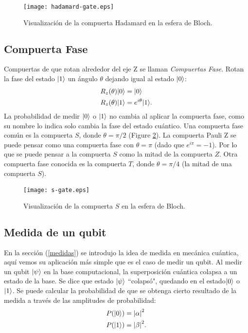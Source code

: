 \begin{figure}[ht]
  \centering
  \texttt{[image: hadamard-gate.eps]}
  \vspace{1mm}
  \caption{Visualización de la compuerta Hadamard en la esfera de Bloch.}
  \label{fig:hadamard_bloch}
\end{figure}

\subsection{Compuerta Fase}
Compuertas de que rotan alrededor del eje Z se llaman \emph{Compuertas Fase}. Rotan la fase del estado $\ket{1}$
un ángulo $\theta$ dejando igual al estado $\ket{0}$:
\begin{equation}
  \begin{aligned}
    R_z(\theta) \ket{0} &= \ket{0} \\
    R_z(\theta) \ket{1} &= e^{i\theta}\ket{1}.
  \end{aligned}
\end{equation}
La probabilidad de medir $\ket{0}$ o $\ket{1}$ no cambia al aplicar la compuerta fase, como su nombre lo indica solo cambia la fase del estado cuántico. Una compuerta fase común es la compuerta $S$, donde $\theta = \pi/2$ (Figure \ref{fig:s_bloch}). La compuerta Pauli Z 
se puede pensar como una compuerta fase con $\theta = \pi$ (dado que $e^{i\pi} = -1$). Por lo que se puede pensar a la compuerta $S$ como la mitad de la compuerta $Z$.
Otra compuerta fase conocida es la compuerta $T$,
donde $\theta = \pi/4$ (la mitad de una compuerta $S$).

\begin{figure}[ht]
  \centering
  \texttt{[image: s-gate.eps]}
  \vspace{1mm}
  \caption{Visualización de la compuerta $S$ en la esfera de Bloch.}
  \label{fig:s_bloch}
\end{figure}


\subsection{Medida de un qubit}
En la sección (\ref{medidas}) se introdujo la idea de medida en mecánica cuántica, aquí vemos su aplicación más simple que es el caso de medir un qubit.
Al medir un qubit $\ket{\psi}$ en la base computacional, la superposición cuántica colapsa a un estado de la base. Se dice que estado $\ket{\psi}$ ``colapsó", quedando en el estado$\ket{0}$ o $\ket{1}$. Se puede calcular la probabilidad de que se obtenga cierto resultado de la medida a través de las amplitudes de probabilidad:
\begin{align}
  P(\ket{0}) &= \left|\alpha\right|^2 \\
  P(\ket{1}) &= \left|\beta\right|^2.
\end{align}

